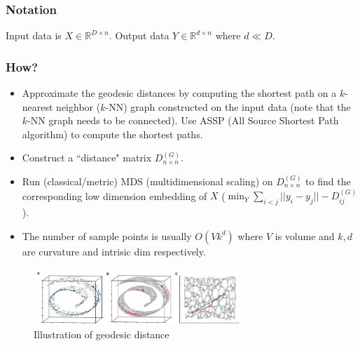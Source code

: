 \subsubsection*{Notation}
Input data is $X \in \mathbb{R}^{D\times n}$. Output data $Y \in
\mathbb{R}^{d\times n}$ where $d\ll D$. 

\subsubsection*{How?}
\begin{itemize}
\item Approximate the geodesic distances by computing the shortest
  path on a $k$-nearest neighbor ($k$-NN) graph constructed on the input data
  (note that the $k$-NN graph needs to be connected). Use ASSP (All Source Shortest Path algorithm) to compute the shortest paths.
\item Construct a ``distance" matrix $D^{(G)}_{n\times n}$.
\item Run (classical/metric) MDS (multidimensional scaling) on $D^{(G)}_{n\times n}$ to find
  the corresponding low dimension embedding of $X$ ($\min_{Y} \sum_{i<j}||y_i - y_j|| -
  D^{(G)}_{ij}$). 
  
 \item The number of sample points is usually $O(Vk^d)$ where $V$ is volume and $k,d$ are curvature and intrisic dim respectively. 
\end{itemize}

\begin{figure}
\centering
\includegraphics[width=0.7\textwidth]{chapter_7/files/isomap.png}
\caption{Illustration of geodesic distance}
\end{figure}


